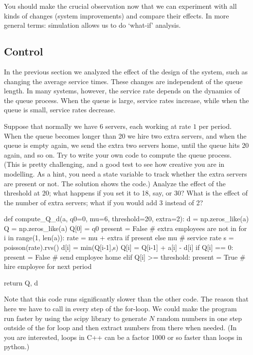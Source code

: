 \documentclass{scrartcl}
\begin{document}
You should make the crucial observation now that we can experiment with all kinds of changes (system improvements) and compare their effects. In more general terms: simulation allows us to do `what-if' analysis. 




\subsection{Control }
\label{sec:control-}

In the previous section we analyzed the effect of the design of the system, such as changing the average service times. These changes are independent of the queue length. In many systems, however, the service rate depends on the dynamics of the queue process. When the queue is large, service rates increase, while when the queue is small, service rates decrease. 

\begin{exercise}
  Suppose that normally we have 6 servers, each working at rate $1$ per period. When the queue becomes longer than 20 we hire two extra servers, and when the queue is empty again, we send the extra two servers home, until the queue hits 20 again, and so on. Try to write your own code to compute the queue process. (This is pretty challenging, and a good test to see how creative you are in modelling. As a hint, you need a state variable to track whether the extra servers are present or not. The solution shows the code.) Analyze the effect of the threshold at 20; what happens if you set it to 18, say, or 30? What is the effect of the number of extra servers; what if you would add 3 instead of 2?
  

  \begin{solution}
    \begin{pyverbatim}
def compute_Q_d(a, q0=0, mu=6, threshold=20, extra=2):
    d = np.zeros_like(a)
    Q = np.zeros_like(a)
    Q[0] = q0
    present = False # extra employees are not in
    for i in range(1, len(a)):
        rate = mu + extra if present else mu # service rate
        s = poisson(rate).rvs()
        d[i] = min(Q[i-1],s)
        Q[i] = Q[i-1] + a[i] - d[i]
        if Q[i] == 0:
            present = False # send employee home
        elif Q[i] >= threshold:
            present = True # hire employee for next period
    
    return Q, d
    
    \end{pyverbatim}



Note that this code runs significantly  slower than the other code. The reason that here we have to call  in every step of the for-loop. We could make the program run faster by using the scipy library to generate $N$ random numbers in one step outside of the for loop and then extract numbers from there when needed. (In you are interested, loops in C++ can be a factor 1000 or so faster than loops in python.)
  \end{solution}
  
\end{exercise}
\end{document}
